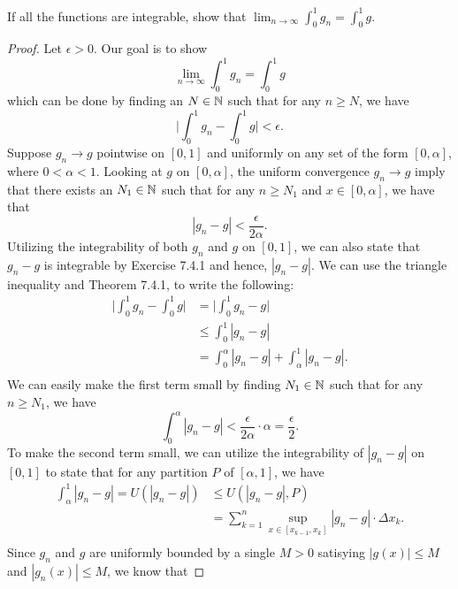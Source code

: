 If all the functions are integrable, show that \( \lim_{ n \to \infty  }  \int_{ 0 }^{ 1 } g_{n} = \int_{ 0 }^{ 1 } g  \).
\begin{proof}
Let \( \epsilon > 0  \). Our goal is to show  
\[  \lim_{ n \to \infty  } \int_{ 0 }^{ 1 } g_{n} = \int_{ 0 }^{ 1 }  g \]
which can be done by finding an \( N \in \mathbb{N}  \) such that for any \(  n \geq N  \), we have 
\[  \Big| \int_{ 0 }^{ 1 } g_{n} - \int_{ 0 }^{ 1 }  g \Big| < \epsilon. \]
Suppose \( g_{n} \to g  \) pointwise on \( [0,1]  \) and uniformly on any set of the form \( [0, \alpha] \), where \( 0 < \alpha < 1  \). Looking at \( g  \) on \( [0, \alpha] \), the uniform convergence \( g_{n} \to g  \) imply that there exists an \(  N_{1} \in \mathbb{N}  \) such that for any \( n \geq N_{1}  \) and \( x \in [0, \alpha ] \), we have that 
\[  | g_{n} - g  | < \frac{ \epsilon  }{  2 \alpha }.  \] Utilizing the integrability of both \( g_{n} \) and \( g  \) on \( [0,1] \), we can also state that \( g_{n} - g  \) is integrable by Exercise 7.4.1 and hence, \( | g_{n} -g  |  \). We can use the triangle inequality and Theorem 7.4.1, to write the following:
\begin{align*}
    \Big| \int_{ 0 }^{ 1 } g_{n} - \int_{ 0 }^{ 1 } g  \Big| &= \Big| \int_{ 0 }^{ 1 } g_{n} - g   \Big|  \\
															 &\leq \int_{ 0 }^{ 1 } | g_{n} - g  |  \\
															 &= \int_{ 0 }^{ \alpha } | g_{n} - g |  + \int_{ \alpha  }^{ 1 }  | g_{n} - g  |. \\ 
\end{align*}
We can easily make the first term small by finding \( N_{1} \in \mathbb{N}  \) such that for any \( n \geq N_1 \), we have 
\[  \int_{ 0 }^{ \alpha  } | g_{n} -g  |  < \frac{ \epsilon  }{ 2 \alpha  } \cdot \alpha = \frac{ \epsilon  }{ 2 } . \] To make the second term small, we can utilize the integrability of \( | g_{n} -g  |  \) on \( [0,1] \) to state that for any partition \( P \) of \( [\alpha,1]  \), we have 
\begin{align*}
    \int_{ \alpha  }^{ 1 } | g_{n} -g  |  = U(| g_{n} - g  | ) 
										  &\leq U( | g_{n} -g  |, P) \\
										  &= \sum_{ k=1 }^{ n } \sup_{x \in [x_{k-1}, x_k]} | g_{n} - g  | \cdot \Delta x_{k }.\\
\end{align*}
Since \( g_{n}  \) and \( g  \) are uniformly bounded by a single \( M > 0  \) satisying \( | g(x)  |  \leq M  \) and \( | g_{n}(x) | \leq M  \), we know that 

\end{proof}
